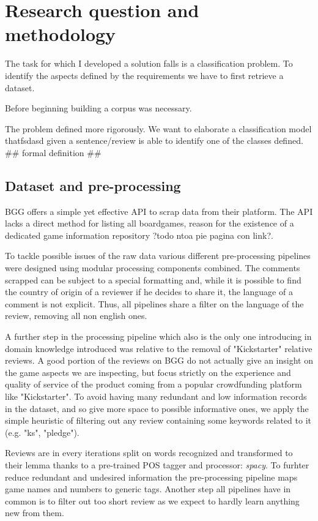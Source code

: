 \section{Research question and methodology}

The task for which I developed a solution falls is a classification problem.
To identify the aspects defined by the requirements we have to first retrieve a dataset.

Before beginning building a corpus was necessary.


The problem defined more rigorously.
We want to elaborate a classification model thatfsdasd given a sentence/review is able to identify one of the classes defined.
## formal definition ##

\subsection{Dataset and pre-processing}
BGG offers a simple yet effective API to scrap data from their platform.
The API lacks a direct method for listing all boardgames, reason for the existence of a dedicated game information
repository ?todo ntoa pie pagina con link?.

To tackle possible issues of the raw data various different pre-processing pipelines were designed using modular
processing components combined.
The comments scrapped can be subject to a special formatting and, while it is possible to find the country of origin
of a reviewer if he decides to share it, the language of a comment is not explicit.
Thus, all pipelines share a filter on the language of the review, removing all non english ones.

A further step in the processing pipeline which also is the only one introducing in domain knowledge introduced was relative
to the removal of "Kickstarter" relative reviews.
A good portion of the reviews on BGG do not actually give an insight on the game aspects we are inspecting,
but focus strictly on the experience and quality of service of the product coming from a popular crowdfunding platform like "Kickstarter".
To avoid having many redundant and low information records in the dataset, and so give more space to possible informative ones,
we apply the simple heuristic of filtering out any review containing some keywords related to it (e.g. "ks", "pledge").

Reviews are in every iterations split on words recognized and transformed to their lemma thanks to a pre-trained
POS tagger and processor: \textit{spacy}. To furhter reduce redundant and undesired information the pre-processing pipeline
maps game names and numbers to generic tags.
Another step all pipelines have in common is to filter out too short review as we expect to hardly learn anything new from them.

